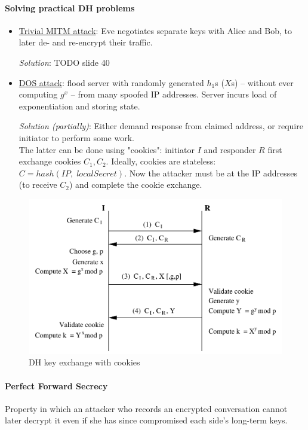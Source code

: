 \paragraph{Solving practical DH problems}
\begin{itemize}
    \item \underline{Trivial MITM attack}: Eve negotiates separate keys with Alice and Bob, to later de- and re-encrypt their traffic.
    
    \textit{Solution}: TODO slide 40
    
    \item \underline{DOS attack}: flood server with randomly generated $h_1$s ($X$s) -- without ever computing $g^x$ -- from many spoofed IP addresses. Server incurs load of exponentiation and storing state.
    
    \textit{Solution (partially)}: Either demand response from claimed address, or require initiator to perform some work. \\
    The latter can be done using "cookies": initiator $I$ and responder $R$ first exchange cookies $C_1, C_2$. Ideally, cookies are stateless: $C = hash(IP, \; localSecret)$. Now the attacker must be at the IP addresses (to receive $C_2$) and complete the cookie exchange.
\end{itemize}
\begin{figure}[h]
    \centering
    \includegraphics[width=12cm]{images/ch9-ike-cookies.png}
    \caption{DH key exchange with cookies}
    \label{fig:ike-cookies}
\end{figure}

\paragraph{Perfect Forward Secrecy} Property in which an attacker who records an encrypted conversation cannot later decrypt it even if she has since compromised each side's long-term keys.

